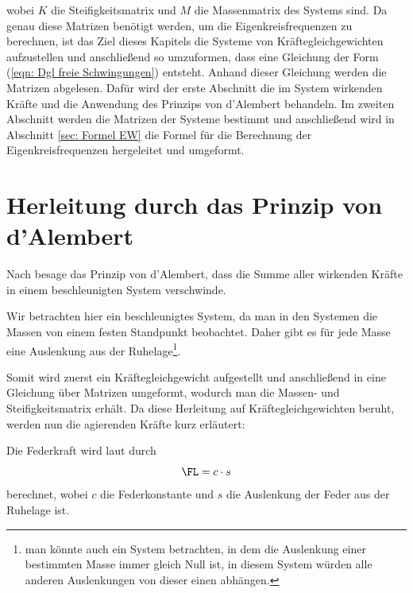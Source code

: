 \documentclass[a4paper,12pt]{report}
\newcommand{\1}{\mathds{1}}
\theoremstyle{plain} %
\theoremstyle{definition} %
\theoremstyle{remark}
\begin{document}
      wobei $K$ die Steifigkeitsmatrix und $M$ die Massenmatrix des Systems sind.
      Da genau diese Matrizen benötigt werden, um die Eigenkreisfrequenzen zu berechnen, ist das Ziel dieses Kapitels die Systeme von Kräftegleichgewichten
      aufzustellen und anschließend so umzuformen, dass eine Gleichung der Form (\ref{eqn: Dgl freie Schwingungen}) entsteht.
      Anhand dieser Gleichung werden die Matrizen abgelesen.
      Dafür wird der erste Abschnitt die im System wirkenden Kräfte und die Anwendung des Prinzips von d'Alembert behandeln.
      Im zweiten Abschnitt werden die Matrizen der Systeme bestimmt und anschließend wird in Abschnitt \ref{sec: Formel EW}
      die Formel für die Berechnung der Eigenkreisfrequenzen hergeleitet und umgeformt. 
      
      \section{Herleitung durch das Prinzip von d'Alembert}
            Nach \cite{d_AlembertPrinzip} besage das Prinzip von d'Alembert, dass die Summe aller wirkenden Kräfte in einem beschleunigten System verschwinde.

            Wir betrachten hier ein beschleunigtes System, da man in den Systemen die Massen von einem festen Standpunkt beobachtet.
            Daher gibt es für jede Masse eine Auslenkung aus der Ruhelage\footnote{man könnte auch ein System betrachten,
            in dem die Auslenkung einer bestimmten Masse immer gleich Null ist, in diesem System würden alle anderen Auslenkungen von dieser einen abhängen.}.

            Somit wird zuerst ein Kräftegleichgewicht aufgestellt und anschließend in eine Gleichung über Matrizen umgeformt,
            wodurch man die Massen- und Steifigkeitsmatrix erhält.
            Da diese Herleitung auf Kräftegleichgewichten beruht, werden nun die agierenden Kräfte kurz erläutert:

            Die Federkraft \FL wird laut \cite{federkraft} durch
            \begin{equation}
                  \label{eqn: Federkraft}
                  \FL = c\cdot s
            \end{equation}
            berechnet, wobei $c$ die Federkonstante und $s$ die Auslenkung der Feder aus der Ruhelage ist.
\end{document}
